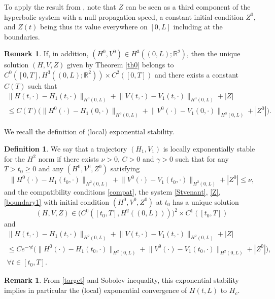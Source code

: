 \documentclass[11pt]{article}
\numberwithin{equation}{section}
\theoremstyle{definition}
\newtheorem{defn}[thm]{Definition}
\newtheorem{rmk}[thm]{Remark}
\begin{document}
To apply the result from \cite{Wang}, note that $Z$ can be seen as a third component of the hyperbolic system with a null propagation speed, a constant initial condition $Z^{0}$, and
$Z(t)$ being thus its value everywhere {on $[0,L]$} including at the boundaries.
\begin{rmk}
\label{r0}
If, in addition, $(H^{0},V^{0})\in H^{3}((0,L);\mathbb{R}^{2})$, then the unique solution $(H,V,Z)$ given by Theorem \ref{th0} belongs to $C^{0}([0,T],H^{3}((0,L);\mathbb{R}^{2}))\times C^{2}([0,T])$ and there exists
a constant $C(T)$ such that
\begin{multline}
\lVert H(t,\cdot)-H_{1}(t,\cdot)\rVert_{H^{3}{(0,L)}}+\lVert V(t,\cdot)-V_{1}(t,\cdot)\rVert_{H^{3}{(0,L)}}+|Z|\\
\leq C(T)\bigl(\lVert H^{0}(\cdot)-H_{1}(0,\cdot)\rVert_{H^{3}{(0,L)}}+\lVert V^{0}(\cdot)-V_{1}(0,\cdot)\rVert_{H^{3}{(0,L)}}+|Z^{0}|\bigr).
\end{multline}
\end{rmk}
We recall the definition of {(local)} exponential stability.
\begin{defn}
\label{defexpstab}
We say that a trajectory $(H_{1},V_{1})$ is {locally} exponentially stable for the $H^{2}$ norm if there exists $\nu>0$, $C>0$ and $\gamma>0$ such that for any $T>t_{0}\geq 0$ and any $(H^{0},V^{0},Z^{0})$ satisfying
\begin{equation*}
\lVert H^{0}(\cdot)-H_{1}(t_{0},\cdot)\rVert_{H^{2}(0,L)}+\lVert V^{0}(\cdot)-V_{1}(t_{0},\cdot)\rVert_{H^{2}(0,L)}+|Z^{0}|\leq \nu,
\end{equation*}
and the compatibility conditions \eqref{compat}, the system \eqref{Stvenant}, \eqref{Z}, \eqref{boundary1} {with initial condition $(H^{0},V^{0},Z^{0})$ at $t_{0}$} has a unique solution
\[
(H,V,Z)\in \bigl(C^{0}([t_{0},T],H^{2}((0,L)))\bigr)^{2}\times C^{1}([t_{0},T])
\]
and
\begin{multline*}
\lVert H(t,\cdot)-H_{1}(t,\cdot)\rVert_{H^{2}(0,L)}+\lVert V(t,\cdot)-V_{1}(t,\cdot)\rVert_{H^{2}(0,L)}+|Z|\\
\leq Ce^{-\gamma t}\bigl(\lVert H^{0}(\cdot)-H_{1}(t_{0},\cdot)\rVert_{H^{2}(0,L)}+\lVert V^{0}(\cdot)-V_{1}(t_{0},\cdot)\rVert_{H^{2}(0,L)}+|Z^{0}|\bigr),\\ \forall t\in[t_{0},T].
\end{multline*}
\end{defn}
\begin{rmk}
From \eqref{target} and Sobolev inequality, this exponential stability implies in particular the {(local)} exponential convergence of $H(t,L)$ to $H_{c}$.
\end{rmk}
\end{document}
